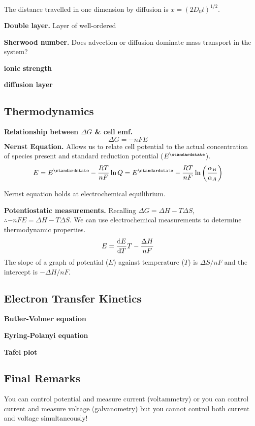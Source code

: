 The distance travelled in one dimension by diffusion is $x = (2D_0t)^{1/2}$.

\textbf{Double layer.} Layer of well-ordered

\textbf{Sherwood number.} Does advection or diffusion dominate mass transport in the system?

\textbf{ionic strength}

\textbf{diffusion layer}

\subsection*{Thermodynamics}
\textbf{Relationship between $\Delta G$ \& cell emf.}
\begin{equation*}
    \Delta G = -nFE
\end{equation*}
\textbf{Nernst Equation.} Allows us to relate cell potential to the actual concentration of species
present and standard reduction potential ($E^\standardstate$).
\begin{equation*}
    E = E^\standardstate - \frac{RT}{nF} \ln Q = E^\standardstate - \frac{RT}{nF} \ln\left(\frac{\alpha_B}{\alpha_A}\right)
\end{equation*}

Nernst equation holds at electrochemical equilibrium.



\textbf{Potentiostatic measurements.} Recalling $\Delta G = \Delta H - T \Delta S$, 
$ \therefore - nFE = \Delta H - T \Delta S$. We can use electrochemical measurements to determine
thermodynamic properties.
\begin{equation*}
    E = \odv{E}{T}T - \frac{\Delta H}{nF}
\end{equation*} The slope of a graph of potential ($E$) against temperature ($T$)
is $\Delta S / nF$ and the intercept is $- \Delta H / nF$.

\subsection*{Electron Transfer Kinetics}

\textbf{Butler-Volmer equation}

\textbf{Eyring-Polanyi equation}

\textbf{Tafel plot}

\subsection*{Final Remarks}
You can control potential and measure current (voltammetry) or you can control current
and measure voltage (galvanometry) but you cannot control both current and voltage
simultaneously!

